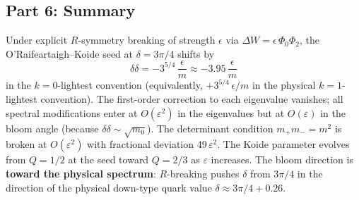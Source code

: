 \documentclass[12pt]{article}
\begin{document}
\subsection*{Part 6: Summary}

Under explicit $R$-symmetry breaking of strength $\epsilon$ via $\Delta W = \epsilon\,\Phi_0\Phi_2$, the O'Raifeartaigh--Koide seed at $\delta = 3\pi/4$ shifts by
$$
\delta\delta = -3^{5/4}\,\frac{\epsilon}{m} \approx -3.95\,\frac{\epsilon}{m}
$$
in the $k=0$-lightest convention (equivalently, $+3^{5/4}\,\epsilon/m$ in the physical $k=1$-lightest convention). The first-order correction to each eigenvalue vanishes; all spectral modifications enter at $O(\varepsilon^2)$ in the eigenvalues but at $O(\varepsilon)$ in the bloom angle (because $\delta\delta \sim \sqrt{m_0}$). The determinant condition $m_+m_- = m^2$ is broken at $O(\varepsilon^2)$ with fractional deviation $49\,\varepsilon^2$. The Koide parameter evolves from $Q = 1/2$ at the seed toward $Q = 2/3$ as $\varepsilon$ increases. The bloom direction is \textbf{toward the physical spectrum}: $R$-breaking pushes $\delta$ from $3\pi/4$ in the direction of the physical down-type quark value $\delta \approx 3\pi/4 + 0.26$.
\end{document}
